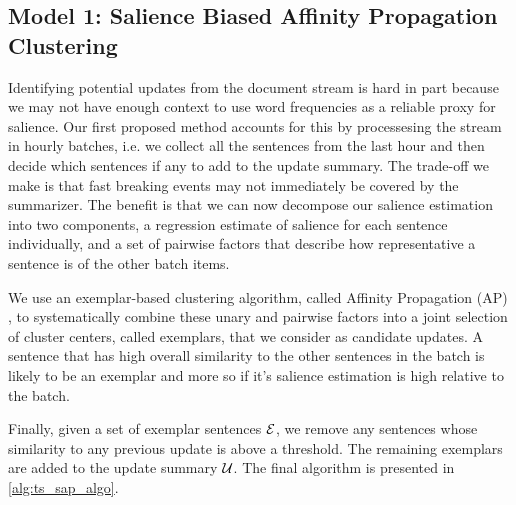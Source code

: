 \subsection{Model 1: Salience Biased Affinity Propagation Clustering}  


  

  Identifying potential updates from the document stream is hard in part
  because we may not have enough context to use word frequencies as a 
  reliable proxy for salience. 
  Our first proposed method accounts for this
  by
  processesing the stream in hourly batches, i.e. we collect all the
  sentences from the last hour and then decide which sentences if any to
  add to the update summary. The trade-off we make is that fast breaking
  events may not immediately be covered by the summarizer. The benefit
  is that we can now decompose our salience estimation into two components,
  a regression estimate of salience for each sentence individually,
  and a set of pairwise factors that describe how representative a sentence 
  is of the other batch items. 


%   

  We use an exemplar-based clustering algorithm,
  called Affinity Propagation (AP) \citep{frey2007clustering}, 
  to systematically combine these unary and pairwise factors into a joint 
  selection of cluster centers, called exemplars, that we consider as 
  candidate updates.
  A sentence that has high overall similarity to
  the other sentences in the batch is likely to be an exemplar and
  more so if it's salience estimation is high relative to the batch.



  
  
  Finally, given a set of exemplar sentences $\mathcal{E}$, we remove any
  sentences whose similarity to any previous update is above a threshold.
  The remaining exemplars are added to the update summary $\mathcal{U}$.
  The final algorithm is presented in \autoref{alg:ts_sap_algo}.



